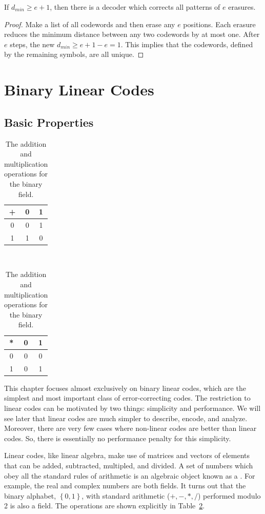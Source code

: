 \begin{proposition}
If $d_{min}\geq e+1$, then there is a decoder which corrects all patterns of $e$ erasures.
\end{proposition}
\begin{proof}
Make a list of all codewords and then erase any $e$ positions.
Each erasure reduces the minimum distance between any two codewords by at most one.
After $e$ steps, the new $d_{min}\geq e+1-e=1$.
This implies that the codewords, defined by the remaining symbols, are all unique.
\end{proof}

\section{Binary Linear Codes}


\subsection{Basic Properties}

\begin{table}
\begin{center}
\begin{tabular}{c||c|c}
+ & 0 & 1\tabularnewline
\hline
\hline
0 & 0 & 1\tabularnewline
\hline 
1 & 1 & 0\tabularnewline
\end{tabular}~~~\begin{tabular}{c||c|c}
{*} & 0 & 1\tabularnewline
\hline
\hline
0 & 0 & 0\tabularnewline
\hline 
1 & 0 & 1\tabularnewline
\end{tabular}
\caption{The addition and multiplication operations for the binary field.}
\label{tab:BinaryField}
\end{center}
\end{table}

This chapter focuses almost exclusively on binary linear codes, which are the simplest and most important class of error-correcting codes.
The restriction to linear codes can be motivated by two things: simplicity and performance.
We will see later that linear codes are much simpler to describe, encode, and analyze.
Moreover, there are very few cases where non-linear codes are better than linear codes.
So, there is essentially no performance penalty for this simplicity.

Linear codes, like linear algebra, make use of matrices and vectors of elements that can be added, subtracted, multipled, and divided.
A set of numbers which obey all the standard rules of arithmetic is an algebraic object known as a .
For example, the real and complex numbers are both fields.
It turns out that the binary alphabet, $\left\{ 0,1\right\} $, with standard arithmetic ($+,-,*,/$) performed modulo 2 is also a field.
The operations are shown explicitly in Table~\ref{tab:BinaryField}.

